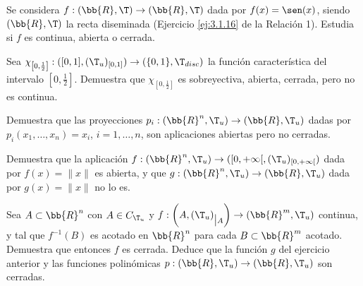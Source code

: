 \begin{ejercicio}
    Se considera $f : (\bb{R},\T) \to (\bb{R},\T)$ dada por $f(x) = \sen(x)$, siendo $(\bb{R},\T)$ la recta diseminada (Ejercicio \ref{ej:3.1.16} de la Relación 1). Estudia si $f$ es continua, abierta o cerrada.
\end{ejercicio}

\begin{ejercicio}
    Sea $\chi_{\left[0,\frac{1}{2}\right]}: ([0, 1],(\T_u)_{[0,1]}) \to (\{0, 1\}, \T_{disc})$ la función característica del intervalo $\left[0,\frac{1}{2}\right]$.
    Demuestra que $\chi_{\left[0,\frac{1}{2}\right]}$ es sobreyectiva, abierta, cerrada, pero no es continua.
\end{ejercicio}


\begin{ejercicio}
    Demuestra que las proyecciones $p_i: (\bb{R}^n, \T_u) \to (\bb{R}, \T_u)$ dadas por $p_i(x_1, \dots , x_n) = x_i$, $i = 1, \dots, n$, son aplicaciones abiertas pero no cerradas.
\end{ejercicio}

\begin{ejercicio}
    Demuestra que la aplicación $f : (\bb{R}^n, \T_u) \to ([0, +\infty[,(\T_u)_{[0,+\infty[})$ dada por $f(x) = \|x\|$ es abierta, y que $g : (\bb{R}^n, \T_u) \to (\bb{R}, \T_u)$ dada por $g(x) = \|x\|$ no lo es.
\end{ejercicio}

\begin{ejercicio}
    Sea $A \subset \bb{R}^n$ con $A \in C_{\T_u}$ y $f : \left(A,{(\T_u)}_{\big|A}\right) \to (\bb{R}^m, \T_u)$ continua, y tal que $f^{-1}(B)$ es acotado en $\bb{R}^n$ para cada $B \subset \bb{R}^m$ acotado. Demuestra que entonces $f$ es cerrada.
    Deduce que la función $g$ del ejercicio anterior y las funciones polinómicas $p : (\bb{R}, \T_u) \to (\bb{R}, \T_u)$ son cerradas.
\end{ejercicio}

